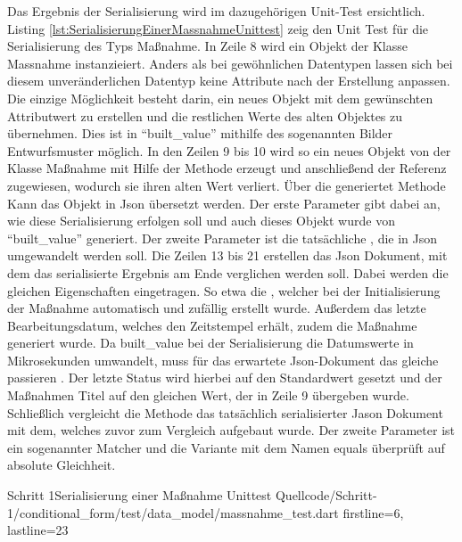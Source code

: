 Das Ergebnis der Serialisierung wird im dazugehörigen Unit-Test ersichtlich. Listing \ref{lst:SerialisierungEinerMassnahmeUnittest} zeig den Unit Test für die Serialisierung des Typs Maßnahme.
In Zeile 8 wird ein Objekt der Klasse Massnahme instanzieiert. Anders als bei gewöhnlichen Datentypen lassen sich bei diesem unveränderlichen Datentyp keine Attribute nach der Erstellung anpassen. Die einzige Möglichkeit besteht darin, ein neues Objekt  mit dem gewünschten Attributwert zu erstellen und die restlichen Werte des alten Objektes zu übernehmen.  Dies ist in \enquote{built_value} mithilfe des sogenannten Bilder Entwurfsmuster möglich. In den Zeilen 9 bis 10 wird so ein neues Objekt von der Klasse Maßnahme mit Hilfe der Methode  erzeugt und anschließend der Referenz  zugewiesen, wodurch sie ihren alten Wert verliert. Über die generiertet Methode  Kann das Objekt in Json übersetzt werden. Der erste Parameter  gibt dabei an, wie diese Serialisierung erfolgen soll und auch dieses Objekt wurde von \enquote{built_value} generiert. Der zweite Parameter ist die tatsächliche , die in Json umgewandelt werden soll. Die Zeilen 13 bis 21 erstellen das Json Dokument, mit dem das serialisierte Ergebnis am Ende verglichen werden soll. Dabei werden die gleichen Eigenschaften eingetragen. So etwa die , welcher bei der Initialisierung der Maßnahme automatisch und zufällig erstellt wurde. Außerdem das letzte Bearbeitungsdatum, welches den Zeitstempel erhält, zudem die Maßnahme generiert wurde. Da built_value bei der Serialisierung die Datumswerte in Mikrosekunden umwandelt, muss für das erwartete Json-Dokument das gleiche passieren . Der letzte Status  wird hierbei auf den Standardwert  gesetzt und der Maßnahmen Titel  auf den gleichen Wert, der in Zeile 9 übergeben wurde. Schließlich vergleicht die Methode  das tatsächlich serialisierter Jason Dokument mit dem, welches zuvor zum Vergleich aufgebaut wurde. Der zweite Parameter ist ein sogenannter Matcher und die Variante mit dem Namen equals überprüft auf absolute Gleichheit.

\begin{alexlisting}{Schritt 1}{Serialisierung einer Maßnahme Unittest}
  {Quellcode/Schritt-1/conditional_form/test/data_model/massnahme_test.dart}
  {firstline=6, lastline=23}
  \label{lst:SerialisierungEinerMassnahmeUnittest}
\end{alexlisting}

